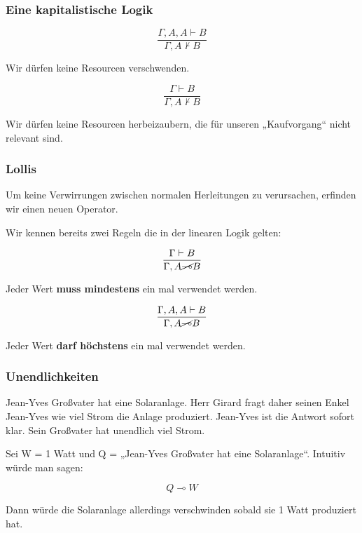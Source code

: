 \documentclass{beamer}
\begin{document}
\begin{frame}
  \frametitle{Eine kapitalistische Logik}

  \begin{equation*}
    \frac{\Gamma, A, A \vdash B}
         {\Gamma, A \nvdash B}
  \end{equation*}

  Wir dürfen keine Resourcen verschwenden.

  \pause%

   \begin{equation*}
    \frac{\Gamma \vdash B}
         {\Gamma, A \nvdash B}
  \end{equation*}

  Wir dürfen keine Resourcen herbeizaubern, die für unseren „Kaufvorgang“ nicht relevant sind.
\end{frame}

\begin{frame}
  \frametitle{Lollis}
  Um keine Verwirrungen zwischen normalen Herleitungen zu verursachen, erfinden wir einen neuen Operator.
  
  \pause%

  Wir kennen bereits zwei Regeln die in der linearen Logik gelten:

  \pause%

  \begin{equation*}
    \frac{\Gamma \vdash B}
         {\Gamma, A \cancel{\multimap} B}
  \end{equation*}

  Jeder Wert \textbf{muss mindestens} ein mal verwendet werden.

  \pause%
  
  \begin{equation*}
    \frac{\Gamma, A, A \vdash B}
         {\Gamma, A \cancel{\multimap} B}
  \end{equation*}

  Jeder Wert \textbf{darf höchstens} ein mal verwendet werden.

\end{frame}

\begin{frame}
  \frametitle{Unendlichkeiten}
  Jean-Yves Großvater hat eine Solaranlage. Herr Girard fragt daher seinen Enkel Jean-Yves wie viel Strom die Anlage produziert.
  Jean-Yves ist die Antwort sofort klar. Sein Großvater hat unendlich viel Strom.

  \pause%

  Sei W = 1 Watt und Q = „Jean-Yves Großvater hat eine Solaranlage“. Intuitiv würde man sagen:

  \begin{equation}
    Q \multimap W
  \end{equation}

  \pause%

  Dann würde die Solaranlage allerdings verschwinden sobald sie 1 Watt produziert hat.
\end{frame}
\end{document}
